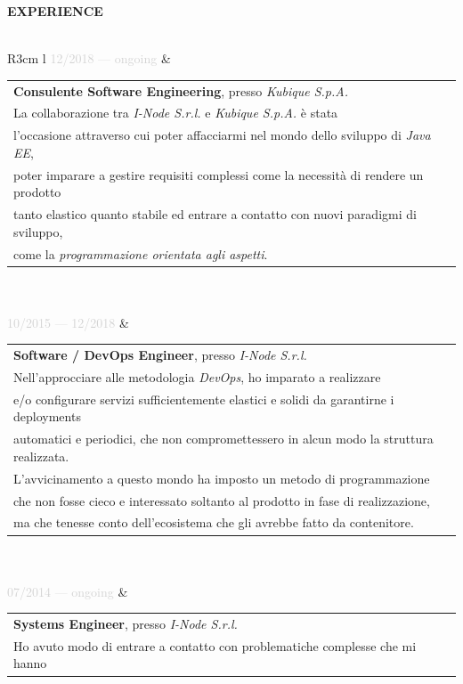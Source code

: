\documentclass{article}
\begin{document}
\textbf{\textcolor{deepblue}{\uppercase{{{experience}}}}} \\\\ \hfill
\begin{tabular}{ R{3cm} l }
	\textcolor{lightgray}{12/2018 — {{ongoing}}} & \begin{tabular}[l]{@{}l@{}}
		\textbf{Consulente Software Engineering}, presso \textit{Kubique S.p.A.} \\
		La collaborazione tra \textit{I-Node S.r.l.} e \textit{Kubique S.p.A.} è stata \\
		l'occasione attraverso cui poter affacciarmi nel mondo dello sviluppo di \textit{Java EE}, \\
		poter imparare a gestire requisiti complessi come la necessità di rendere un prodotto \\
		tanto elastico quanto stabile ed entrare a contatto con nuovi paradigmi di sviluppo, \\
		come la \textit{programmazione orientata agli aspetti}.
	\end{tabular} \\\\ \hfill
	\textcolor{lightgray}{10/2015 — 12/2018} & \begin{tabular}[l]{@{}l@{}}
		\textbf{Software / DevOps Engineer}, presso \textit{I-Node S.r.l.} \\
		Nell'approcciare alle metodologia \textit{DevOps}, ho imparato a realizzare \\
		e/o configurare servizi sufficientemente elastici e solidi da garantirne i deployments \\
		automatici e periodici, che non compromettessero in alcun modo la struttura realizzata. \\
		L'avvicinamento a questo mondo ha imposto un metodo di programmazione \\
		che non fosse cieco e interessato soltanto al prodotto in fase di realizzazione, \\
		ma che tenesse conto dell'ecosistema che gli avrebbe fatto da contenitore.
	\end{tabular} \\\\ \hfill
	\textcolor{lightgray}{07/2014 — {{ongoing}}}   & \begin{tabular}[l]{@{}l@{}}
		\textbf{Systems Engineer}, presso \textit{I-Node S.r.l.} \\
		Ho avuto modo di entrare a contatto con problematiche complesse che mi hanno \\

\end{tabular}
\end{tabular}
\end{document}
